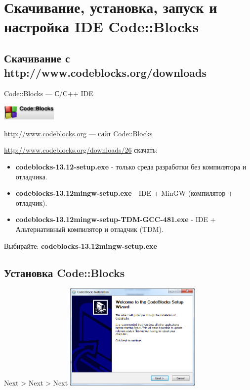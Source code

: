 \section{Скачивание, установка, запуск и настройка IDE Code::Blocks}

\subsection{Скачивание с http://www.codeblocks.org/downloads}

\begin{frame}[t]{Code::Blocks --- С/C++ IDE}

\includegraphics[width=0.2\textwidth]{logo}

\url{http://www.codeblocks.org} --- сайт Code::Blocks

\url{http://www.codeblocks.org/downloads/26} скачать:

  \begin{itemize}
    \item \textbf{codeblocks-13.12-setup.exe} - только среда разработки без компилятора и отладчика. 
    \item \textbf{codeblocks-13.12mingw-setup.exe} - IDE + MinGW (компилятор + отладчик).
    \item \textbf{codeblocks-13.12mingw-setup-TDM-GCC-481.exe} - IDE + Альтернативный компилятор и отладчик (TDM).
  \end{itemize}

  Выбирайте: \textbf{codeblocks-13.12mingw-setup.exe}

\end{frame}

\subsection{Установка Code::Blocks}

\begin{frame}[t]{Next > Next > Next}
\includegraphics[width=0.5\textwidth]{00_codeblocks/step1.png}
\end{frame}

